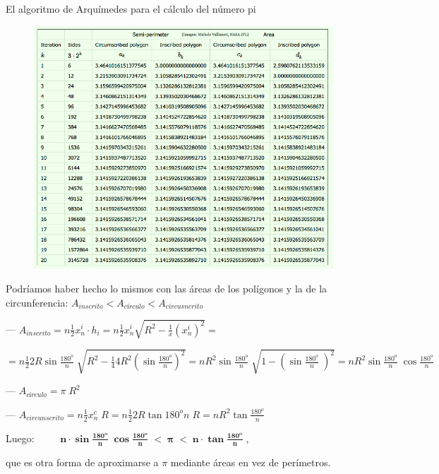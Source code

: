 \begin{myexampleblock}{El algoritmo de Arquímedes para el cálculo del número pi}
	\begin{figure}[H]
		\centering
		\includegraphics[width=1\textwidth]{img-ft/T01IM28.png}
	\end{figure}
	
	\noindent Podríamos haber hecho lo mismos con las áreas de los polígonos y la de la circunferencia: $A_{inscrito} < A_{círculo} < A_{circusncrito}$
	
	\noindent --- $A_{inscrito} = n \frac 1 2 x_n^i \cdot h_i = n \frac 1 2 x_n^i \sqrt{R^2-\frac 1 x (x_n^i)^2}=$
	
	\noindent  $=n \frac 1 2 2 R \sin \frac {180^o}{n}\;  \sqrt{R^2- \frac 1 4 4R^2 (\sin \frac {180^o}{n})^2}= n R^2 \sin \frac {180^o}{n}\; \sqrt{1 -(\sin \frac {180^o}{n}\;)^2}=   n R^2 \sin \frac {180^o}{n}\; \cos \frac {180^o}{n}$
	
	\noindent --- $A_{círculo}=\pi\; R^2$
	
	\noindent --- $A_{circunscrito}=n \frac 1 2 x_n^c \; R = n \frac 1 2 2 R \tan {180^o}{n}\; R = n R^2 \tan \frac {180^o}{n}$
	
 Luego: $\qquad \boxed{\;\boldsymbol{n\cdot \sin \frac {180^o}{n}\; \cos \frac {180^o}{n} \; < \; \pi \; <\; n\cdot \tan \frac {180^o}{n} } \; }$, 
	
	\noindent que es otra forma de aproximarse a $\pi$ mediante áreas en vez de perímetros.

\end{myexampleblock}

\newpage

